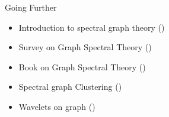 \documentclass[a4paper,11pt]{book}
\begin{document}
\begin{textbox}{Going Further}
\begin{itemize}
    \item Introduction to spectral graph theory (\cite{nica2016brief})
    \item Survey on Graph Spectral Theory (\cite{spielman2012spectral})

    \item Book on Graph Spectral Theory (\cite{chung1997spectral})
    \item Spectral graph Clustering (\cite{nascimento2011spectral})
    \item Wavelets on graph (\cite{hammond2011wavelets})

\end{itemize}








\end{textbox}






\end{document}
